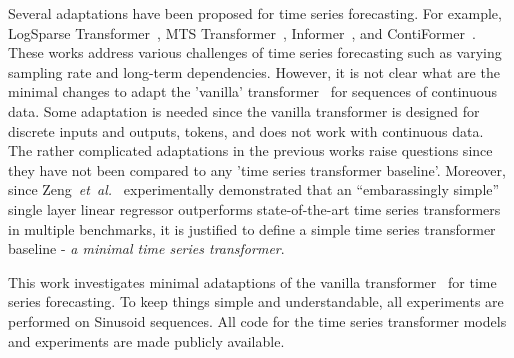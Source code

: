 \documentclass[final]{article}
\begin{document}
Several adaptations have been proposed for time series forecasting.
For
example, LogSparse Transformer~\cite{Li-2019-neurips}, MTS Transformer~\cite{Zerveas-2021-kdd}, Informer~\cite{Informer}, and ContiFormer~\cite{ContiFormer}. These works address various challenges of time series forecasting such as varying sampling rate and long-term dependencies. However, it is not clear what are the minimal changes to adapt the 'vanilla' transformer~\cite{transformer} for sequences of continuous data. Some adaptation is needed since the vanilla transformer is designed for discrete inputs and outputs, tokens, and does not work with continuous data. The rather complicated adaptations in the previous works raise questions since they have not been compared to any 'time series transformer baseline'. Moreover, since Zeng~\textit{et~al.}~\cite{Zeng-2023-aaai} experimentally demonstrated that an ``embarassingly simple'' single layer linear regressor outperforms state-of-the-art time series transformers in multiple benchmarks, it is justified to define a simple time series transformer baseline - \textit{a minimal time series transformer}.

This work investigates minimal adataptions of the vanilla transformer~\cite{transformer} for time series forecasting. To keep things simple and understandable, all experiments are performed on Sinusoid sequences. All code for the time series transformer models and experiments are made publicly available.

\end{document}
